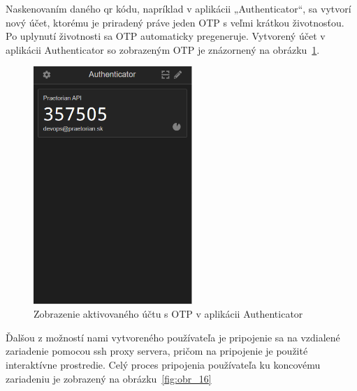 Naskenovaním daného qr kódu, napríklad v aplikácii „Authenticator“, sa vytvorí nový účet, ktorému je priradený práve jeden OTP
s veľmi krátkou životnosťou.
Po uplynutí životnosti sa OTP automaticky pregeneruje.
Vytvorený účet v aplikácii Authenticator so zobrazeným OTP je znázornený na obrázku~\ref{fig:obr_15}.

\begin{figure}[H]
\begin{center}\includegraphics[width=\textwidth,height=9cm,keepaspectratio=true]{assets/authenticator.png}\end{center}
\caption[Zobrazenie aktivovaného účtu s OTP v aplikácii Authenticator]{Zobrazenie aktivovaného účtu s OTP v aplikácii Authenticator}\label{fig:obr_15}
\end{figure}

Ďalšou z možností nami vytvoreného používateľa je pripojenie sa na vzdialené zariadenie pomocou ssh proxy servera, pričom na
pripojenie je použité interaktívne prostredie.
Celý proces pripojenia používateľa ku koncovému zariadeniu je zobrazený na obrázku~\ref{fig:obr_16}


